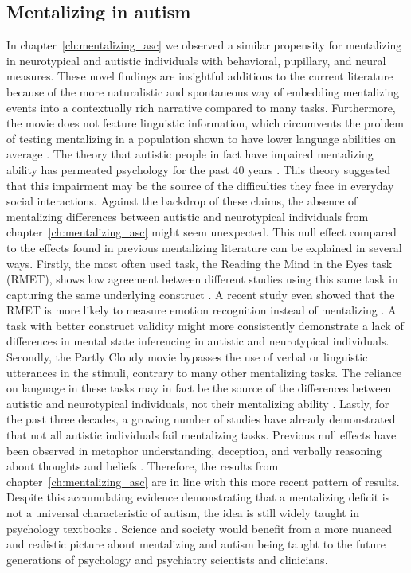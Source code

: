 \subsection{Mentalizing in autism}
In chapter~\ref{ch:mentalizing_asc} we observed a similar propensity for mentalizing in neurotypical and autistic individuals with behavioral, pupillary, and neural measures. These novel findings are insightful additions to the current literature because of the more naturalistic and spontaneous way of embedding mentalizing events into a contextually rich narrative compared to many tasks. Furthermore, the movie does not feature linguistic information, which circumvents the problem of testing mentalizing in a population shown to have lower language abilities on average \citep{velikonja2019}. The theory that autistic people in fact have impaired mentalizing ability has permeated psychology for the past 40 years \citep{baron-cohen1985,gernsbacher2019}. This theory suggested that this impairment may be the source of the difficulties they face in everyday social interactions. Against the backdrop of these claims, the absence of mentalizing differences between autistic and neurotypical individuals from chapter~\ref{ch:mentalizing_asc} might seem unexpected. This null effect compared to the effects found in previous mentalizing literature can be explained in several ways. Firstly, the most often used task, the Reading the Mind in the Eyes task (RMET), shows low agreement between different studies using this same task in capturing the same underlying construct \citep{higgins2024}. A recent study even showed that the RMET is more likely to measure emotion recognition instead of mentalizing \citep{oakley2016}. A task with better construct validity might more consistently demonstrate a lack of differences in mental state inferencing in autistic and neurotypical individuals. Secondly, the Partly Cloudy movie bypasses the use of verbal or linguistic utterances in the stimuli, contrary to many other mentalizing tasks. The reliance on language in these tasks may in fact be the source of the differences between autistic and neurotypical individuals, not their mentalizing ability \citep{shaked2006,capage2001,gernsbacher2005,scheeren2013}. Lastly, for the past three decades, a growing number of studies have already demonstrated that not all autistic individuals fail mentalizing tasks. Previous null effects have been observed in metaphor understanding, deception, and verbally reasoning about thoughts and beliefs \citep{happe1993, bowler1992, pantelis2017, vantiel2021, ponnet2005, scheeren2013}. Therefore, the results from chapter~\ref{ch:mentalizing_asc} are in line with this more recent pattern of results. Despite this accumulating evidence demonstrating that a mentalizing deficit is not a universal characteristic of autism, the idea is still widely taught in psychology textbooks \citep{coon2021,kellogg2016,sigelman2018,myers2014}. Science and society would benefit from a more nuanced and realistic picture about mentalizing and autism being taught to the future generations of psychology and psychiatry scientists and clinicians.


